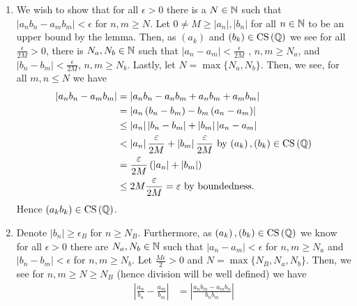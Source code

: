 \documentclass[a4paper]{article}
\begin{document}
\begin{solution}
	\begin{enumerate}
		\item We wish to show that for all \(\epsilon > 0\) there is a \(N \in \mathbb{N}\) such that \(\left| a_{n}b_{n} - a_{m} b_{m} \right| < \epsilon\) for \(n, m \ge N\).  Let \(0 \neq M \ge \left| a_{n} \right| , \left| b_{n} \right| \) for all \(n \in \mathbb{N}\) to be an upper bound by the lemma. Then, as \(\left( a_{k} \right) \) and \(\left( b_{k} \right) \in \operatorname{CS} \left( \mathbb{Q} \right) \) we see for all \(\frac{\epsilon}{2M} > 0\), there is \(N_{a}, N_{b}\in \mathbb{N}\) such that \(\left| a_{n} - a_{m} \right|< \frac{\epsilon}{2M} \) , \(n, m \ge N_{a}\), and \(\left| b_{n} - b_{m} \right| < \frac{\epsilon}{2M} \), \(n, m \ge N_{b}\). Lastly, let \(N = \max \{N_{a}, N_{b}\} \). Then, we see, for all \(m, n \le N\) we have
			\begin{align*}
				\left| a_{n}b_{n} - a_{m}b_{m} \right| &= \left| a_{n}b_{n} - a_{n}b_{m} + a_{n}b_{m} + a_{m}b_{m} \right| \\
								       &= \left| a_{n}\left( b_{n} - b_{m} \right) - b_{m} \left( a_{n} - a_{m} \right)   \right|  \\
						&\le \left| a_{n} \right| \left| b_{n} - b_{m} \right| + \left| b_{m} \right| \left| a_{n} - a_{m} \right|  \\
						&< \left| a_{n} \right| \frac{\varepsilon}{2M} + \left| b_{m} \right| \frac{\varepsilon}{2M} \text{ by \(\left( a_{k} \right) , \left( b_{k} \right) \in \operatorname{CS}\left( \ensuremath{\mathbb{Q}}\right) \)}\\
						&= \frac{\varepsilon}{2M}\left( \left| a_{n} \right|  + \left| b_{m} \right|  \right)  \\
						&\le 2M\frac{\varepsilon}{2M} = \varepsilon	\text{ by boundedness}
			.\end{align*}
			Hence \(\left( a_{k}b_{k} \right) \in \operatorname{CS} \left( \mathbb{Q} \right) \).
		\item Denote \(\left| b_{n} \right| \ge \epsilon_{B}\) for \(n \ge N_B\). Furthermore, as \(\left( a_{k} \right), \left( b_{k} \right) \in \operatorname{CS}\left( \mathbb{Q} \right)  \) we know for all \(\epsilon > 0\) there are \(N_{a}, N_{b}\in \mathbb{N}\) such that \(\left| a_{n} - a_{m} \right| <\epsilon \) for \(n, m \ge N_{a}\) and \(\left| b_{n} - b_{m} \right|  < \epsilon\) for \(n, m \ge N_{b}\). Let \(\frac{M\epsilon}{2} > 0\) and \(N = \max \{N_{B}, N_{a}, N_{b}\} \). Then, we see for \(n, m \ge N \ge N_{B}\) (hence division will be well defined) we have
			\begin{align*}
				\left| \frac{a_{n}}{b_{n}} - \frac{a_{m}}{b_{m}} \right| &= \left| \frac{a_{n}b_{m} - a_{m}b_{n}}{b_{n}b_{m}} \right| \\

\end{align*}
\end{enumerate}
\end{solution}
\end{document}
